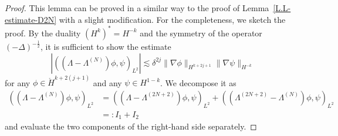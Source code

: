 \documentclass[11pt,leqno]{article}
\numberwithin{equation}{section}
\numberwithin{figure}{section}
\begin{document}
\begin{proof}
This lemma can be proved in a similar way to the proof of Lemma~\ref{L.L-estimate-D2N} with a slight modification. 
For the completeness, we sketch the proof. 
By the duality $(H^k)^*=H^{-k}$ and the symmetry of the operator $(-\Delta)^{-\frac12}$, it is sufficient to show the estimate 
%
\[
|((\Lambda-\Lambda^{(N)})\phi,\psi)_{L^2}|
\lesssim \delta^{2j}\|\nabla \phi\|_{H^{k+2j+1}} \|\nabla\psi\|_{H^{-k}}
\]
%
for any $\phi\in\mathring{H}^{k+2(j+1)}$ and any $\psi\in H^{1-k}$. 
We decompose it as 
%
\begin{align*}
((\Lambda-\Lambda^{(N)})\phi,\psi)_{L^2}
&= ((\Lambda-\Lambda^{(2N+2)})\phi,\psi)_{L^2} + ((\Lambda^{(2N+2)}-\Lambda^{(N)})\phi,\psi)_{L^2} \\
&=: I_1+I_2
\end{align*}
%
and evaluate the two components of the right-hand side separately. 



\end{proof}
\end{document}
